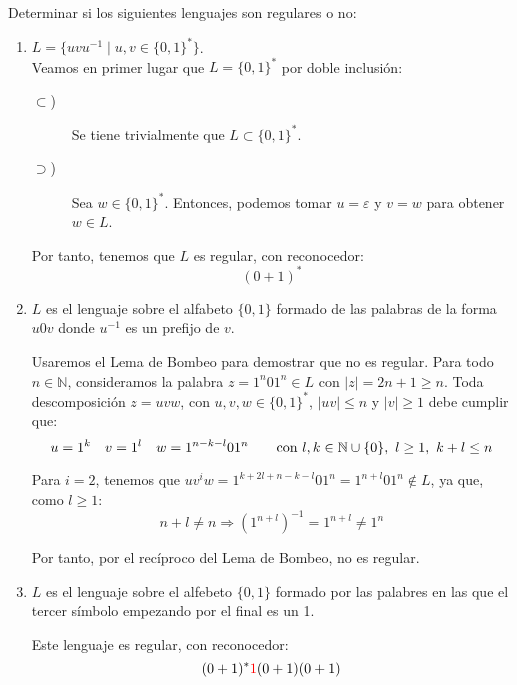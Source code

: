 \begin{ejercicio}\label{ej:1.3.6}
    Determinar si los siguientes lenguajes son regulares o no:
    \begin{enumerate}
        \item $L=\{uvu^{-1} \mid u,v \in {\{0,1\}}^{\ast}\}$.\\
        
        Veamos en primer lugar que $L=\{0,1\}^*$ por doble inclusión:
        \begin{description}
            \item[$\subset$)] Se tiene trivialmente que $L\subset \{0,1\}^*$.
            \item[$\supset$)] Sea $w\in \{0,1\}^*$. Entonces, podemos tomar $u=\varepsilon$ y $v=w$ para obtener $w\in L$.
        \end{description}

        Por tanto, tenemos que $L$ es regular, con reconocedor:
        \begin{equation*}
            (0+1)^*
        \end{equation*}

        \item $L$ es el lenguaje sobre el alfabeto $\{0,1\}$ formado de las palabras de la forma $u0v$ donde $u^{-1}$ es un prefijo de $v$.
        
        Usaremos el Lema de Bombeo para demostrar que no es regular. Para todo $n\in \mathbb{N}$, consideramos la palabra $z=1^n01^n\in L$ con $|z|=2n+1\geq n$. Toda descomposición $z=uvw$, con $u,v,w\in \{0,1\}^\ast$, $|uv|\leq n$ y $|v|\geq 1$ debe cumplir que:
        \begin{equation*}
            u=1^k \quad v=1^l \quad w=1^{n-k-l}01^n \qquad \text{con } l,k\in \mathbb{N}\cup \{0\},~l\geq 1,~k+l\leq n
        \end{equation*}

        Para $i=2$, tenemos que $uv^iw=1^{k+2l+n-k-l}01^n=1^{n+l}01^n\notin L$, ya que, como $l\geq 1$:
        \begin{equation*}
            n+l\neq n\Longrightarrow (1^{n+l})^{-1}=1^{n+l}\neq 1^n
        \end{equation*}

        Por tanto, por el recíproco del Lema de Bombeo, no es regular.
        \item $L$ es el lenguaje sobre el alfebeto $\{0,1\}$ formado por las palabres en las que el tercer símbolo empezando por el final es un 1.
        
        Este lenguaje es regular, con reconocedor:
        \begin{equation*}
            (0+1)^*{\color{red}1}(0+1)(0+1)
        \end{equation*}
    \end{enumerate}
\end{ejercicio}

